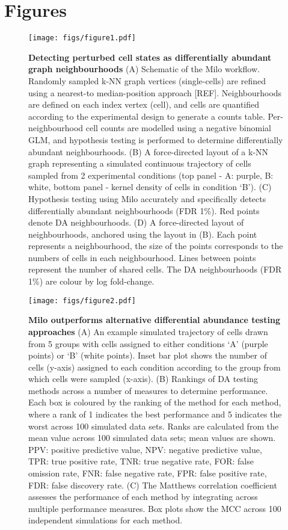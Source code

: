 \documentclass[
]{article}
\author{}
\date{\vspace{-2.5em}}
\begin{document}
\hypertarget{figures}{%
\section*{Figures}\label{figures}}

\begin{figure}
\centering
\texttt{[image: figs/figure1.pdf]}
\caption{\label{fig:fig-1}\textbf{Detecting perturbed cell states as differentially abundant graph neighbourhoods}
(A) Schematic of the Milo workflow. Randomly sampled k-NN graph vertices (single-cells) are refined using a nearest-to median-position approach {[}REF{]}. Neighbourhoods are defined on each index vertex (cell), and cells are quantified according to the experimental design to generate a counts table. Per-neighbourhood cell counts are modelled using a negative binomial GLM, and hypothesis testing is performed to determine differentially abundant neighbourhoods.
(B) A force-directed layout of a k-NN graph representing a simulated continuous trajectory of cells sampled from 2 experimental conditions (top panel - A: purple, B: white, bottom panel - kernel density of cells in condition `B').
(C) Hypothesis testing using Milo accurately and specifically detects differentially abundant neighbourhoods (FDR 1\%). Red points denote DA neighbourhoods.
(D) A force-directed layout of neighbourhoods, anchored using the layout in (B). Each point represents a neighbourhood, the size of the points corresponds to the numbers of cells in each neighbourhood. Lines between points represent the number of shared cells. The DA neighbourhoods (FDR 1\%) are colour by log fold-change.}
\end{figure}







\begin{figure}
\centering
\texttt{[image: figs/figure2.pdf]}
\caption{\label{fig:fig-2}\textbf{Milo outperforms alternative differential abundance testing approaches}
(A) An example simulated trajectory of cells drawn from 5 groups with cells assigned to either conditions `A' (purple points) or `B' (white points). Inset bar plot shows the number of cells (y-axis) assigned to each condition according to the group from which cells were sampled (x-axis).
(B) Rankings of DA testing methods across a number of measures to determine performance. Each box is coloured by the ranking of the method for each method, where a rank of 1 indicates the best performance and 5 indicates the worst across 100 simulated data sets. Ranks are calculated from the mean value across 100 simulated data sets; mean values are shown. PPV: positive predictive value, NPV: negative predictive value, TPR: true positive rate, TNR: true negative rate, FOR: false omission rate, FNR: false negative rate, FPR: false positive rate, FDR: false discovery rate.
(C) The Matthews correlation coefficient assesses the performance of each method by integrating across multiple performance measures. Box plots show the MCC across 100 independent simulations for each method.}
\end{figure}
\end{document}
